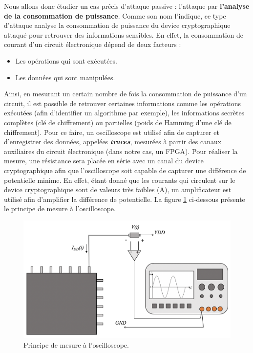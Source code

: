 \documentclass[10pt, oneside, a4paper]{article}
\begin{document}
Nous allons donc étudier un cas précis d'attaque passive : l'attaque par \textbf{l'analyse de la consommation de puissance}. Comme son nom l'indique, ce type d'attaque analyse la consommation de puissance du device cryptographique attaqué pour retrouver des informations sensibles. En effet, la consommation de courant d'un circuit électronique dépend de deux facteurs : 
\begin{itemize}
\item Les opérations qui sont exécutées.
\item Les données qui sont manipulées.
\end{itemize}
Ainsi, en mesurant un certain nombre de fois la consommation de puissance d'un circuit, il est possible de retrouver certaines informations comme les opérations exécutées (afin d'identifier un algorithme par exemple), les informations secrètes complètes (clé de chiffrement) ou partielles (poids de Hamming d'une clé de chiffrement). Pour ce faire, un oscilloscope est utilisé afin de capturer et d'enregistrer des données, appelées \textbf{\textit{traces}}, mesurées à partir des canaux auxiliaires du circuit électronique (dans notre cas, un FPGA). Pour réaliser la mesure, une résistance sera placée en série avec un canal du device cryptographique afin que l'oscilloscope soit capable de capturer une différence de potentielle minime. En effet, étant donné que les courants qui circulent sur le device cryptographique sont de valeurs très faibles (\si{\micro}A), un amplificateur est utilisé afin d'amplifier la différence de potentielle. La figure \ref{fig:oscillo} ci-dessous présente le principe de mesure à l'oscilloscope.
\begin{figure}[htbp]
    \centering
    \includegraphics[scale=0.4]{image/oscillo}
    \caption{Principe de mesure à l'oscilloscope.}
    \label{fig:oscillo} 
\end{figure}
\end{document}

